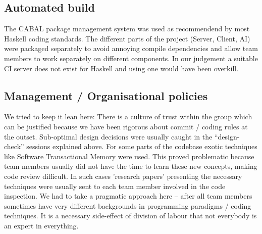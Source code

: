 \documentclass[11pt]{article}
\begin{document}
\subsection{Automated build}
The CABAL package management system was used as recommendend by most
Haskell coding standards. The different parts of the project (Server, Client,
AI) were packaged separately to avoid annoying compile dependencies and
allow team members to work separately on different components. In our judgement
a suitable CI server does not exist for Haskell and using one would have been 
overkill.

\subsection{Management / Organisational policies}
We tried to keep it lean here: There is a culture of trust within the group which
can be justified because we have been rigorous about commit / coding rules at the
outset. Sub-optimal design decisions were usually caught in the ``design-check'' sessions 
explained above. For some parts of the codebase exotic techniques like Software
Transactional Memory were used. This proved problematic because team members
usually did not have the time to learn these new concepts, making code review
difficult. In such cases 'research papers' presenting the necessary techniques
were usually sent to each team member involved in the code inspection. We had
to take a pragmatic approach here -- after all team members sometimes have very
different backgrounds in programming paradigms / coding techniques. It is a necessary
side-effect of division of labour that not everybody is an expert in everything.
\end{document}
